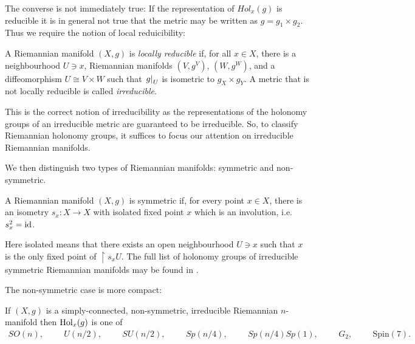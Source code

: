 \documentclass{article}
\begin{document}
The converse is not immediately true: If the representation of
$Hol_x(g)$ is reducible it is in general not true that the metric
may be written as $g=g_1\times g_2$. Thus we require the notion of
local reduicibility:

\begin{definition}
  A Riemannian manifold $(X,g)$ is \emph{locally reducible} if, for
  all $x\in X$, there is a neighbourhood $U\ni x$, Riemannian manifolds
  $(V,g^V)$, $(W,g^W)$, and a diffeomorphism $U\cong V\times W$ such that
  $\left.{g}\right\vert_{U}$ is isometric to $g_X\times g_Y$.
  A metric that is not locally reducible is called \emph{irreducible}.
\end{definition}

This is the correct notion of irreducibility as the representations
of the holonomy groups of an irreducible metric are guaranteed to
be irreducible. So, to classify Riemannian holonomy groups, it suffices
to focus our attention on irreducible Riemannian manifolds.

We then distinguish two types of Riemannian manifolds: symmetric
and non-symmetric.

\begin{definition}
  A Riemannian manifold $(X,g)$ is symmetric if, for every point $x\in X$,
  there is an isometry $s_x : X\to X$ with isolated fixed point $x$ which is
  an involution, i.e. $s_x^2 = \operatorname{id}$.
\end{definition}

Here isolated means that there exists an open neighbourhood $U\ni x$
such that $x$ is the only fixed point of $\restriction{s_x}{U}$.
The full list of holonomy groups of irreducible symmetric Riemannian
manifolds may be found in \cite{besse1987}.

The non-symmetric case is more compact:

\begin{theorem}[Berger]
  If $(X,g)$ is a simply-connected, non-symmetric, irreducible Riemannian
  $n$-manifold then $\operatorname{Hol}_x(g)$ is one of
  \begin{align*}
    SO(n), \hspace{1cm}
    U(n/2), \hspace{1cm}
    SU(n/2), \hspace{1cm}
    Sp(n/4), \hspace{1cm}
    Sp(n/4)Sp(1), \hspace{1cm}
    G_2, \hspace{1cm}
    \text{Spin}(7).
  \end{align*}
\end{theorem}
\end{document}
